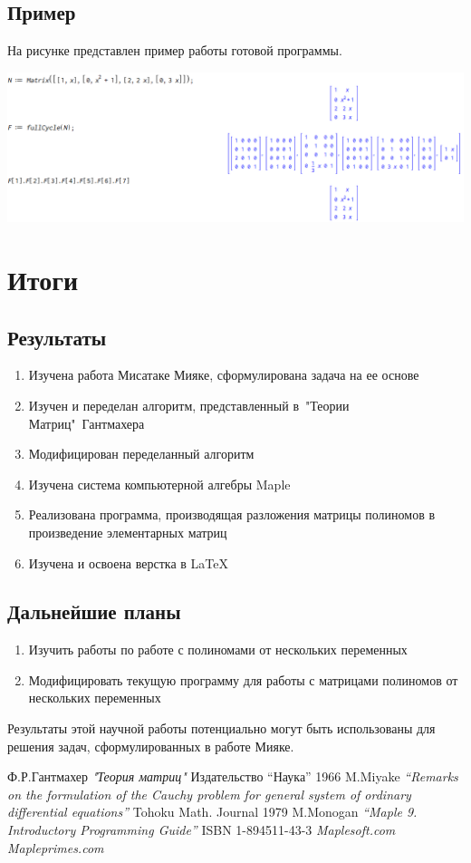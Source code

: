 \documentclass[14pt, a4paper]{extreport}
\begin{document}
		\section{Пример}
		На рисунке представлен пример работы готовой программы.\\
		\begin{center}
			\includegraphics[width=\textwidth]{example.png}
		\end{center}
	\chapter{Итоги}
	\section{Результаты}
	\begin{enumerate}
		\item Изучена работа \cite{miyake} Мисатаке Мияке, сформулирована задача на ее основе
		\item Изучен и переделан алгоритм, представленный в\ "Теории Матриц"\ Гантмахера \cite{gantmaher}
		\item Модифицирован переделанный алгоритм
		\item Изучена система компьютерной алгебры Maple
		\item Реализована программа, производящая разложения матрицы полиномов в
		произведение элементарных матриц
		\item Изучена и освоена верстка в LaTeX
	\end{enumerate}
	\section{Дальнейшие планы}
	\begin{enumerate}
		\item Изучить работы по работе с полиномами от нескольких переменных
		\item Модифицировать текущую программу для работы с матрицами полиномов
		от нескольких переменных
	\end{enumerate}
	Результаты этой научной работы потенциально могут быть использованы
	для решения задач, сформулированных в работе \cite{miyake} Мияке.
	\begin{thebibliography}{5}
			Ф.Р.Гантмахер
			\textit{"Теория матриц"}
			Издательство “Наука” 1966
			M.Miyake
			\textit{“Remarks on the formulation of the Cauchy problem 
			for general system of ordinary differential equations”}
			Tohoku Math. Journal 1979
			M.Monogan
			\textit{“Maple 9. Introductory Programming Guide”}
			ISBN 1-894511-43-3
			\textit{Maplesoft.com}
			\textit{Mapleprimes.com}
	\end{thebibliography}
\end{document}
